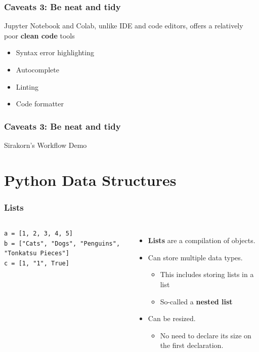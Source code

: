 \documentclass[aspectratio=169]{beamer}
\begin{document}
\begin{frame}
    \frametitle{Caveats 3: Be neat and tidy}
    Jupyter Notebook and Colab, unlike IDE and code editors, offers a relatively poor \textbf{clean code} tools
    \begin{itemize}
        \item Syntax error highlighting
        \item Autocomplete
        \item Linting
        \item Code formatter
    \end{itemize}
\end{frame}

\begin{frame}
    \frametitle{Caveats 3: Be neat and tidy}
    \centering
    {\LARGE Sirakorn's Workflow Demo}
\end{frame}

\section{Python Data Structures}

\begin{frame}[fragile]
    \frametitle{Lists}
    \begin{columns}
            \begin{lstlisting}[style=defaultstyle]
a = [1, 2, 3, 4, 5]
b = ["Cats", "Dogs", "Penguins", "Tonkatsu Pieces"]
c = [1, "1", True]\end{lstlisting}
            \begin{itemize}[<+(1)->]
                \item \textbf{Lists} are a compilation of objects.
                \item Can store multiple data types.
                \begin{itemize}
                    \item This includes storing lists in a list
                    \item So-called a \textbf{nested list}
                \end{itemize}
                \item Can be resized.
                \begin{itemize}
                    \item No need to declare its size on the first declaration.
                \end{itemize}
            \end{itemize}
    \end{columns}
\end{frame}
\end{document}
